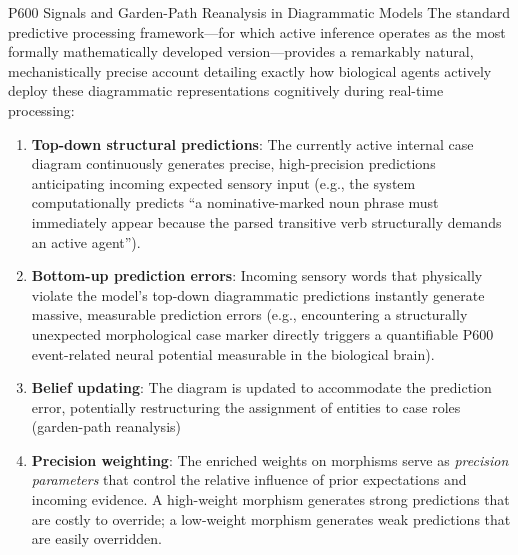 \documentclass[
  ignorenonframetext,
]{beamer}
\begin{document}
\begin{frame}{P600 Signals and Garden-Path Reanalysis in Diagrammatic
Models}
\protect{}\label{p600-signals-and-garden-path-reanalysis-in-diagrammatic-models}
The standard predictive processing framework---for which active
inference operates as the most formally mathematically developed
version---provides a remarkably natural, mechanistically precise account
detailing exactly how biological agents actively deploy these
diagrammatic representations cognitively during real-time processing:

\begin{enumerate}
\item
  \textbf{Top-down structural predictions}: The currently active
  internal case diagram continuously generates precise, high-precision
  predictions anticipating incoming expected sensory input (e.g., the
  system computationally predicts ``a nominative-marked noun phrase must
  immediately appear because the parsed transitive verb structurally
  demands an active agent'').
\item
  \textbf{Bottom-up prediction errors}: Incoming sensory words that
  physically violate the model's top-down diagrammatic predictions
  instantly generate massive, measurable prediction errors (e.g.,
  encountering a structurally unexpected morphological case marker
  directly triggers a quantifiable P600 event-related neural potential
  measurable in the biological brain).
\item
  \textbf{Belief updating}: The diagram is updated to accommodate the
  prediction error, potentially restructuring the assignment of entities
  to case roles (garden-path reanalysis)
\item
  \textbf{Precision weighting}: The enriched weights on morphisms serve
  as \emph{precision parameters} that control the relative influence of
  prior expectations and incoming evidence. A high-weight morphism
  generates strong predictions that are costly to override; a low-weight
  morphism generates weak predictions that are easily overridden.
\end{enumerate}
\end{frame}
\end{document}
